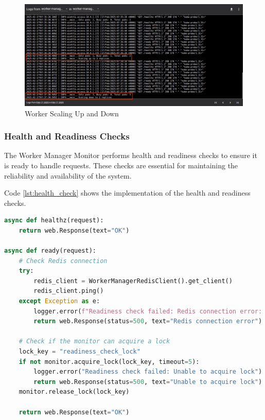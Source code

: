\begin{figure}[H]
  \centering
  \includegraphics[width=\textwidth]{figures/worker_scaling_up_down.png}
  \caption{Worker Scaling Up and Down}
  \label{fig:worker_scaling_up_down}
\end{figure}

\subsubsection{Health and Readiness Checks}
The Worker Manager Monitor performs health and readiness checks to ensure it is ready to handle requests. These checks are essential for maintaining the reliability and availability of the system. 

Code \ref{lst:health_check} shows the implementation of the health and readiness checks.

\begin{lstlisting}[language=python, caption={Worker Manager Monitor Health and Readiness Checks}, label={lst:health_check}]
async def healthz(request):
    return web.Response(text="OK")

async def ready(request):
    # Check Redis connection
    try:
        redis_client = WorkerManagerRedisClient().get_client()
        redis_client.ping()
    except Exception as e:
        logger.error(f"Readiness check failed: Redis connection error: {str(e)}")
        return web.Response(status=500, text="Redis connection error")

    # Check if the monitor can acquire a lock
    lock_key = "readiness_check_lock"
    if not monitor.acquire_lock(lock_key, timeout=5):
        logger.error("Readiness check failed: Unable to acquire lock")
        return web.Response(status=500, text="Unable to acquire lock")
    monitor.release_lock(lock_key)

    return web.Response(text="OK")
\end{lstlisting}

